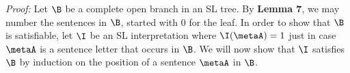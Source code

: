 %
%



\label{HintikkaLemma}

\textit{Proof:}
Let $\B$ be a complete open branch in an SL tree. 
By \textbf{Lemma 7}, we may number the sentences in $\B$, started with 0 for the leaf. 
In order to show that $\B$ is satisfiable, let $\I$ be an SL interpretation where $\I(\metaA)=1$ just in case $\metaA$ is a sentence letter that occurs in $\B$.
We will now show that $\I$ satisfies $\B$ by induction on the position of a sentence $\metaA$ in $\B$. %



